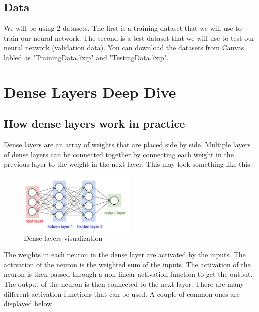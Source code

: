 \documentclass[11pt]{report}
\begin{document}
\section{Data}
We will be using 2 datasets. The first is a training dataset that we will use to train our neural network. The second is a test dataset that we will use to test our neural network (validation data). You can download the datasets from Canvas labled as "TrainingData.7zip" and "TestingData.7zip". 

\chapter{Dense Layers Deep Dive}
\section{How dense layers work in practice}
Dense layers are an array of weights that are placed side by side. Multiple layers of dense layers can be connected together by connecting each weight in the previous layer to the weight in the next layer. This may look something like this:


    \begin{figure}[h]
        \begin{center}
        \includegraphics[width=0.5\textwidth]{denselayers.jpeg}
        \caption{Dense layers visualization}
        \label{fig:dense_layers}
        \end{center}
    \end{figure}

The weights in each neuron in the dense layer are activated by the inputs. The activation of the neuron is the weighted sum of the inputs. The activation of the neuron is then passed through a non-linear activation function to get the output. The output of the neuron is then connected to the next layer. There are many different activation functions that can be used. A couple of common ones are displayed below.
 
\end{document}
